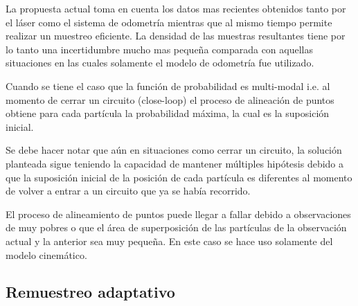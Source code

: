 \documentclass[10pt,a4paper]{article}
\begin{document}
La propuesta actual toma en cuenta los datos mas recientes obtenidos tanto por el láser como el sistema de odometría mientras que al mismo tiempo permite realizar un muestreo eficiente. La densidad de las muestras resultantes tiene por lo tanto una incertidumbre mucho mas pequeña comparada con aquellas situaciones en las cuales solamente el modelo de odometría fue utilizado.

Cuando se tiene el caso que la función de probabilidad es multi-modal i.e. al momento de cerrar un circuito (close-loop) el proceso de alineación de puntos obtiene para cada partícula la probabilidad máxima, la cual es la suposición inicial.

Se debe hacer notar que aún en situaciones como cerrar un circuito, la solución planteada sigue teniendo la capacidad de mantener múltiples hipótesis debido a que la suposición inicial de la posición de cada partícula es diferentes al momento de volver a entrar a un circuito que ya se había recorrido.

El proceso de alineamiento de puntos puede llegar a fallar debido a observaciones de muy pobres o que el área de superposición de las partículas de la observación actual y la anterior sea muy pequeña. En este caso se hace uso solamente del modelo cinemático.

\subsection{Remuestreo adaptativo}
\end{document}
